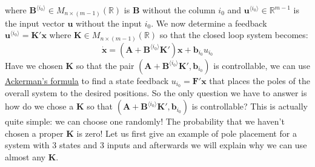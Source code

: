 \documentclass[a4paper,10pt,oneside]{book}
\begin{document}
where $\mathbf{B}^{\langle i_0 \rangle}\in M_{n\times (m-1)}(\mathbb{R})$ is $\mathbf{B}$ without the column $i_0$ and $\mathbf{u}^{\langle i_0 \rangle}\in \mathbb{R}^{m-1}$ is the input vector $\mathbf{u}$ without the input $i_0$. We now determine a feedback $\mathbf{u}^{\langle i_0 \rangle}=\mathbf{K}'\mathbf{x}$ where $\mathbf{K}\in M_{n\times(m-1)}(\mathbb{R})$ so that the closed loop system becomes:
\begin{equation}
 \dot{\mathbf{x}}=(\mathbf{A}+\mathbf{B}^{\langle i_0 \rangle}\mathbf{K}')\mathbf{x}+\mathbf{b}_{i_0} u_{i_0}
\end{equation}
Have we chosen $\mathbf{K}$ so that the pair $(\mathbf{A}+\mathbf{B}^{\langle i_0 \rangle}\mathbf{K}',\mathbf{b}_{i_0})$ is controllable, we can use \hyperlink{prop:AckermansFormula}{Ackerman's formula} to find a state feedback $u_{i_0}=\mathbf{F}'\mathbf{x}$ that places the poles of the overall system to the desired positions. So the only question we have to answer is how do we chose a $\mathbf{K}$ so that $(\mathbf{A}+\mathbf{B}^{\langle i_0 \rangle}\mathbf{K}',\mathbf{b}_{i_0})$ is controllable? This is actually quite simple: we can choose one randomly! The probability that we haven't chosen a proper $\mathbf{K}$ is zero! Let us first give an example of pole placement for a system with 3 states and 3 inputs and afterwards we will explain why we can use almost any $\mathbf{K}$.
\end{document}

